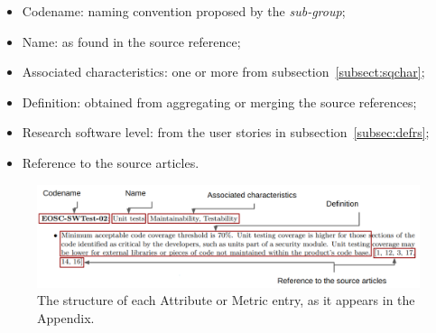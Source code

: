 \begin{itemize}
    \item Codename: naming convention proposed by the \textit{sub-group};
    \item Name: as found in the source reference;
    \item Associated characteristics: one or more from subsection~\ref{subsect:sqchar};
    \item Definition: obtained from aggregating or merging the source references;
    \item Research software level: from the user stories in subsection~\ref{subsec:defrs};
    \item Reference to the source articles.
\end{itemize}

\begin{figure}[h]
    \centering
    \includegraphics[width=0.99\linewidth]{imgs/qa.png}
    \caption{The structure of each Attribute or Metric entry, as it appears in the Appendix.}
    \label{fig:sqattr}
\end{figure}

